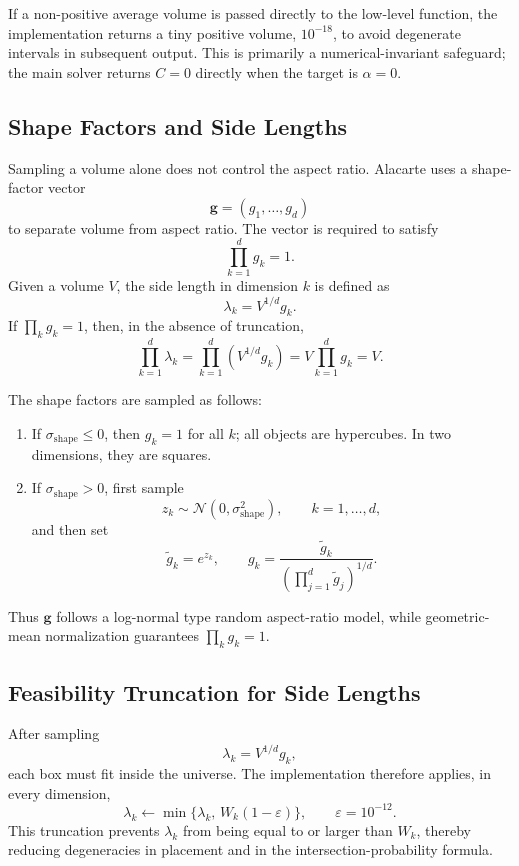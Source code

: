 \documentclass[11pt,a4paper]{article}
\newcommand{\Normal}{\mathcal{N}}
\begin{document}
If a non-positive average volume is passed directly to the low-level function, the implementation returns a tiny positive volume, $10^{-18}$, to avoid degenerate intervals in subsequent output. This is primarily a numerical-invariant safeguard; the main solver returns $C=0$ directly when the target is $\alpha=0$.

\subsection{Shape Factors and Side Lengths}

Sampling a volume alone does not control the aspect ratio. Alacarte uses a shape-factor vector
\[
  \mathbf g=(g_1,\dots,g_d)
\]
to separate volume from aspect ratio. The vector is required to satisfy
\[
  \prod_{k=1}^{d}g_k=1.
\]
Given a volume $V$, the side length in dimension $k$ is defined as
\[
  \lambda_k=V^{1/d}g_k.
\]
If $\prod_k g_k=1$, then, in the absence of truncation,
\[
  \prod_{k=1}^{d}\lambda_k
  =
  \prod_{k=1}^{d}(V^{1/d}g_k)
  =V\prod_{k=1}^{d}g_k
  =V.
\]

The shape factors are sampled as follows:
\begin{enumerate}
  \item If $\sigma_{\mathrm{shape}}\le0$, then $g_k=1$ for all $k$; all objects are hypercubes. In two dimensions, they are squares.
  \item If $\sigma_{\mathrm{shape}}>0$, first sample
  \[
    z_k\sim\Normal(0,\sigma_{\mathrm{shape}}^2),
    \qquad k=1,\dots,d,
  \]
  and then set
  \[
    \tilde g_k=e^{z_k},
    \qquad
    g_k=\frac{\tilde g_k}{\left(\prod_{j=1}^{d}\tilde g_j\right)^{1/d}}.
  \]
\end{enumerate}
Thus $\mathbf g$ follows a log-normal type random aspect-ratio model, while geometric-mean normalization guarantees $\prod_k g_k=1$.

\subsection{Feasibility Truncation for Side Lengths}

After sampling
\[
  \lambda_k=V^{1/d}g_k,
\]
each box must fit inside the universe. The implementation therefore applies, in every dimension,
\[
  \lambda_k
  \leftarrow
  \min\{\lambda_k,\,W_k(1-\varepsilon)\},
  \qquad \varepsilon=10^{-12}.
\]
This truncation prevents $\lambda_k$ from being equal to or larger than $W_k$, thereby reducing degeneracies in placement and in the intersection-probability formula.
\end{document}
